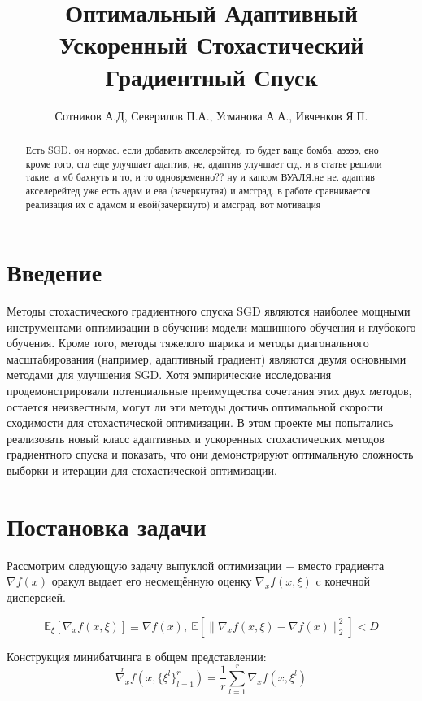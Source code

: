 \documentclass[a4paper,12pt]{article}
\author{
	Сотников А.Д, Северилов П.А., Усманова А.А., Ивченков Я.П.}
\title{Оптимальный Адаптивный Ускоренный Стохастический Градиентный Спуск}
\theoremstyle{plain} %
\theoremstyle{definition} %
\theoremstyle{remark} %
\theoremstyle{definition}
\theoremstyle{definition}
\begin{document}
	\maketitle
	
	\begin{abstract}
		Есть SGD. он нормас. если добавить акселерэйтед, то будет ваще бомба. аээээ, ено кроме того, сгд еще улучшает адаптив, не, адаптив улучшает сгд. и в статье решили такие: а мб бахнуть и то, и то одновременно?? ну и капсом ВУАЛЯ.не не. адаптив акселерейтед уже есть адам и ева (зачеркнутая) и амсград. в работе сравнивается реализация их с адамом и евой(зачеркнуто) и амсград. вот мотивация
	\end{abstract}
	
	\section{Введение}
	Методы стохастического градиентного спуска SGD являются наиболее мощными инструментами оптимизации в обучении модели машинного обучения и глубокого обучения. Кроме того, методы тяжелого шарика и методы диагонального масштабирования (например, адаптивный градиент) являются двумя основными методами для улучшения SGD. Хотя эмпирические исследования продемонстрировали потенциальные преимущества сочетания этих двух методов, остается неизвестным, могут ли эти методы достичь оптимальной скорости сходимости	для стохастической оптимизации. В этом проекте мы попытались реализовать новый класс адаптивных и ускоренных стохастических методов градиентного спуска и показать, что они демонстрируют оптимальную сложность выборки и итерации для стохастической оптимизации. 	
	\section{Постановка задачи}
	
	
	
	Рассмотрим следующую задачу выпуклой оптимизации $-$ вместо градиента $\nabla f(x)$ оракул выдает его несмещённую оценку $\nabla_x f(x, \xi)$ c конечной дисперсией.
	
	\begin{equation}
	\mathbb{E}_{\xi}[\nabla_xf(x, \xi)] \equiv \nabla f(x),~\mathbb{E}[\|\nabla_x f(x,\xi)-\nabla f(x)\|_2^2] < D
	\end{equation}
	
	Конструкция минибатчинга в общем представлении:
	\begin{equation}
	\overset{r}{\nabla_x}f(x, \{\xi^l\}_{l=1}^r) = \frac{1}{r}\sum\limits_{l=1}^r \nabla_x f(x, \xi^l)
	\end{equation}
	
\end{document}
